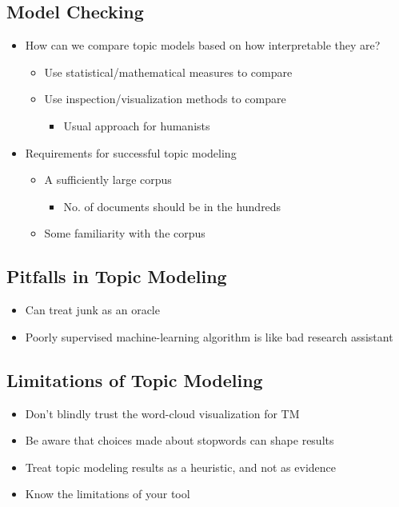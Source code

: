 \documentclass[a4paper]{article}
\begin{document}
\subsection{Model Checking}
\begin{itemize}
    \item How can we compare topic models based on how interpretable they are?
    \begin{itemize}[label=$\circ$]
        \item Use statistical/mathematical measures to compare
        \item Use inspection/visualization methods to compare
        \begin{itemize}[label=\tiny$\blacksquare$]
            \item Usual approach for humanists
        \end{itemize}
    \end{itemize}
    \item Requirements for successful topic modeling
    \begin{itemize}[label=$\circ$]
        \item A sufficiently large corpus
        \begin{itemize}[label=\tiny$\blacksquare$]
            \item No. of documents should be in the hundreds
        \end{itemize}
        \item Some familiarity with the corpus
    \end{itemize}
\end{itemize}

\subsection{Pitfalls in Topic Modeling}
\begin{itemize}
    \item Can treat junk as an oracle
    \item Poorly supervised machine-learning algorithm is like bad research assistant
\end{itemize}

\subsection{Limitations of Topic Modeling}
\begin{itemize}
    \item Don't blindly trust the word-cloud visualization for TM
    \item Be aware that choices made about stopwords can shape results
    \item Treat topic modeling results as a heuristic, and not as evidence
    \item Know the limitations of your tool
\end{itemize}
\end{document}
